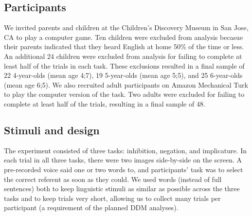 \documentclass[10pt,letterpaper]{article}
\newcommand{\aen}[1]{\textcolor{DarkOrange}{[aen: #1]}}
\begin{document}

\subsection{Participants}

We invited parents and children at the Children's Discovery Museum in San Jose, CA to play a computer game. Ten children were excluded from analysis becasue their parents indicated that they heard English at home 50\% of the time or less. An additional 24 children were excluded from analysis for failing to complete at least half of the trials in each task. These exclusions resulted in a final sample of 22 4-year-olds (mean age 4;7), 19 5-year-olds (mean age 5;5), and 25 6-year-olds (mean age 6;5). We also recruited adult participants on Amazon Mechanical Turk to play the computer version of the task. Two adults were excluded for failing to complete at least half of the trials, resulting in a final sample of 48.

\subsection{Stimuli and design}

The experiment consisted of three tasks: inhibition, negation, and implicature. In each trial in all three tasks, there were two images side-by-side on the screen. A pre-recorded voice said one or two words to, and participants' task was to select the correct referent as soon as they could. We used words (instead of full sentences) both to keep linguistic stimuli as similar as possible across the three tasks and to keep trials very short, allowing us to collect many trials per participant (a requirement of the planned DDM analyses).
\end{document}
